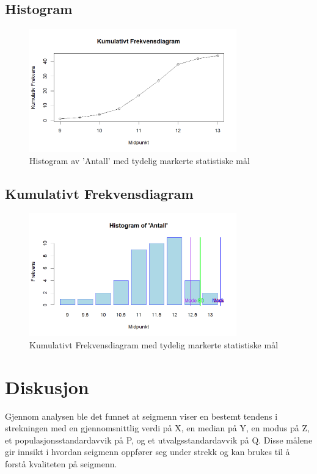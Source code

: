 \documentclass{article}
\begin{document}
\subsection{Histogram}
\begin{figure}[H]
    \centering
    \includegraphics[width=0.8\textwidth]{Rplot.png}
    \caption{Histogram av 'Antall' med tydelig markerte statistiske mål}
\end{figure}

\subsection{Kumulativt Frekvensdiagram}
\begin{figure}[H]
    \centering
    \includegraphics[width=0.8\textwidth]{Rplot02.png}
    \caption{Kumulativt Frekvensdiagram med tydelig markerte statistiske mål}
\end{figure}

\section{Diskusjon}
Gjennom analysen ble det funnet at seigmenn viser en bestemt tendens i strekningen med en gjennomsnittlig verdi på X, en median på Y, en modus på Z, et populasjonsstandardavvik på P, og et utvalgsstandardavvik på Q. Disse målene gir innsikt i hvordan seigmenn oppfører seg under strekk og kan brukes til å forstå kvaliteten på seigmenn.
\end{document}
